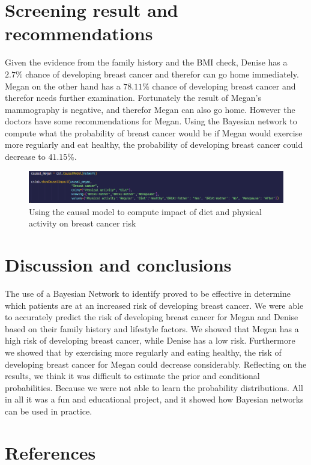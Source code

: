 \documentclass{article}
\begin{document}
\section{Screening result and recommendations}
Given the evidence from the family history and the BMI check, Denise has a $2.7\%$ chance of developing breast cancer and therefor can go home immediately.
Megan on the other hand has a $78.11\%$ chance of developing breast cancer and therefor needs further examination.
Fortunately the result of Megan's mammography is negative, and therefor Megan can also go home.
However the doctors have some recommendations for Megan. Using the Bayesian network to compute what the probability of breast cancer would be if Megan would exercise more regularly and eat healthy, the probability of developing breast cancer could decrease to $41.15\%$.

\begin{figure}[H]
    \centering
    \includegraphics[width=\textwidth]{../figures/causal_megan_code.png}
    \caption{Using the causal model to compute impact of diet and physical activity on breast cancer risk}
    \label{fig:causal:1}
\end{figure}



\section{Discussion and conclusions}
The use of a Bayesian Network to identify proved to be effective in determine which patients are at an increased risk of developing breast cancer.
We were able to accurately predict the risk of developing breast cancer for Megan and Denise based on their family history and lifestyle factors.
We showed that Megan has a high risk of developing breast cancer, while Denise has a low risk. Furthermore we showed that by exercising more regularly and eating healthy, the risk of developing breast cancer for Megan could decrease considerably.
Reflecting on the results, we think it was difficult to estimate the prior and conditional probabilities. Because we were not able to learn the probability distributions. 
All in all it was a fun and educational project, and it showed how Bayesian networks can be used in practice.
\section{References}


\end{document}
